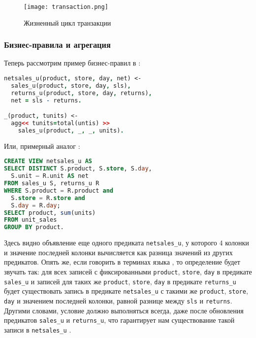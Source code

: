 \begin{landscape}
  \begin{figure}
  	\centering
  	\texttt{[image: transaction.png]}
  	\caption{Жизненный цикл транзакции}
  	\label{fig:technology:logiql:transaction}
  \end{figure}
\end{landscape}

\subsubsection{Бизнес-правила и агрегация}
\label{sec:technology:logiql:aggregations}

Теперь рассмотрим пример бизнес-правил в \logiql:

\begin{lstlisting}[language=Prolog]
netsales_u(product, store, day, net) <-
  sales_u(product, store, day, sls),
  returns_u(product, store, day, returns),
  net = sls - returns.

_(product, tunits) <-
  agg<< tunits=total(untis) >>
    sales_u(product, _, _, units).
\end{lstlisting}

Или, примерный аналог \sql:

\begin{lstlisting}[language=SQL]
CREATE VIEW netsales_u AS
SELECT DISTINCT S.product, S.store, S.day,
  S.unit – R.unit AS net
FROM sales_u S, returns_u R
WHERE S.product = R.product and
  S.store = R.store and
  S.day = R.day;
SELECT product, sum(units)
FROM unit_sales
GROUP BY product.
\end{lstlisting}

Здесь видно объявление еще одного предиката  \lstinline{netsales_u}, у которого 4 колонки и значение последней колонки вычисляется как разница значений из других предикатов. Опять же, если говорить в терминах языка \logiql, то определение будет звучать так: для всех записей с фиксированными \lstinline{product}, \lstinline{store}, \lstinline{day} в предикате \lstinline{sales_u} и записей для таких же \lstinline{product}, \lstinline{store}, \lstinline{day} в предикате \lstinline{returns_u} будет существовать запись в предикате \lstinline{netsales_u} с такими же \lstinline{product}, \lstinline{store}, \lstinline{day} и значением последней колонки, равной разнице между \lstinline{sls} и \lstinline{returns}. Другими словами, условие должно выполняться всегда, даже после обновления предикатов \lstinline{sales_u} и \lstinline{returns_u}, что гарантирует нам существование такой записи в \lstinline{netsales_u} \cite{query_language_for_smart_db}.

